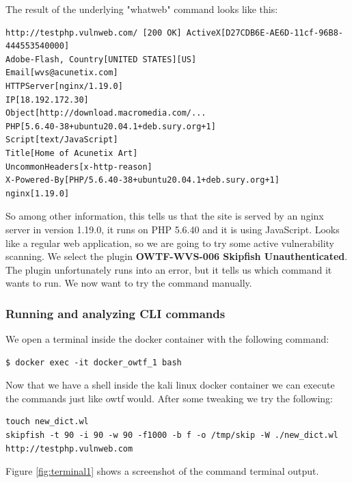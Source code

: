 The result of the underlying "whatweb" command looks like this:

\begin{verbatim}
http://testphp.vulnweb.com/ [200 OK] ActiveX[D27CDB6E-AE6D-11cf-96B8-444553540000]
Adobe-Flash, Country[UNITED STATES][US]
Email[wvs@acunetix.com]
HTTPServer[nginx/1.19.0]
IP[18.192.172.30]
Object[http://download.macromedia.com/...
PHP[5.6.40-38+ubuntu20.04.1+deb.sury.org+1]
Script[text/JavaScript]
Title[Home of Acunetix Art]
UncommonHeaders[x-http-reason]
X-Powered-By[PHP/5.6.40-38+ubuntu20.04.1+deb.sury.org+1]
nginx[1.19.0]
\end{verbatim}

So among other information, this tells us that the site is served by an nginx server in version 1.19.0, it runs on PHP 5.6.40 and it is using JavaScript. Looks like a regular web application, so we are going to try some active vulnerability scanning. We select the plugin \textbf{OWTF-WVS-006 Skipfish Unauthenticated}. The plugin unfortunately runs into an error, but it tells us which command it wants to run. We now want to try the command manually.

\subsubsection{Running and analyzing CLI commands}

We open a terminal inside the docker container with the following command:

\begin{lstlisting}
$ docker exec -it docker_owtf_1 bash
\end{lstlisting}

Now that we have a shell inside the kali linux docker container we can execute the commands just like \ac{owtf} would. After some tweaking we try the following:

\begin{lstlisting}
touch new_dict.wl
skipfish -t 90 -i 90 -w 90 -f1000 -b f -o /tmp/skip -W ./new_dict.wl http://testphp.vulnweb.com
\end{lstlisting}

Figure \ref{fig:terminal1} shows a screenshot of the command terminal output.

